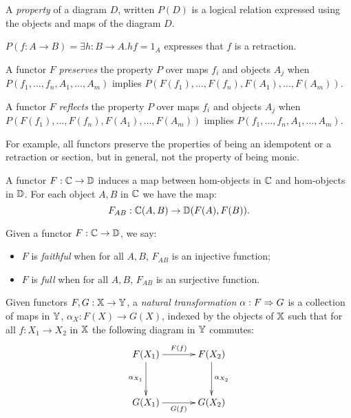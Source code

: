 \begin{definition}\label{def:property_of_a_diagram}
  A \emph{property} of a diagram $D$, written $P(D)$ is a logical relation expressed using the
  objects and maps of the diagram $D$.
\end{definition}

\begin{example}
  $P(f:A \to B) = \exists h : B \to A. h f = 1_A$ expresses that $f$ is a retraction.
\end{example}

\begin{definition}\label{def:functor_preserving_a_property}
  A functor $F$ \emph{preserves} the property $P$ over maps $f_i$ and objects $A_j$ when
  $P(f_1,\ldots,f_n, A_1,\ldots,A_m)$ implies $P(F(f_1),\ldots,F(f_n), F(A_1),\ldots,F(A_m))$.
\end{definition}

\begin{definition}\label{def:functor_reflects_a_property}
  A functor $F$ \emph{reflects} the property $P$ over maps $f_i$ and objects $A_j$ when
  $P(F(f_1),\ldots,F(f_n), F(A_1),\ldots,F(A_m))$ implies $P(f_1,\ldots,f_n, A_1,\ldots,A_m)$.
\end{definition}

For example, all functors preserve the properties of being an idempotent or a retraction or section,
but in general, not the property of being monic.

A functor $F:\mathbb{C} \to \mathbb{D}$ induces a map between hom-objects in $\mathbb{C}$ and hom-objects in $\mathbb{D}$. For
each object $A,B$ in $\mathbb{C}$ we have the map:
\[
  F_{AB} : \mathbb{C}(A,B) \to \mathbb{D}(F(A),F(B)).
\]

\begin{definition}\label{def:full_functor_faithful_functor}
  Given a functor $F:\mathbb{C} \to \mathbb{D}$, we say:
  \begin{itemize}
    \item $F$ is \emph{faithful} when for all $A,B$, $F_{AB}$ is an injective function;
    \item $F$ is \emph{full} when  for all $A,B$, $F_{AB}$ is an surjective function.
  \end{itemize}
\end{definition}



\begin{definition}\label{def:natural_transformation}
  Given functors $F,G:\mathbb{X} \to \mathbb{Y}$, a \emph{natural transformation} $\alpha:F \Rightarrow G$ is a collection
  of maps in $\mathbb{Y}$, $\alpha_X : F(X) \to G(X)$, indexed by the objects of $\mathbb{X}$ such that for all
  $f:X_1 \to X_2$ in $\mathbb{X}$ the following diagram in $\mathbb{Y}$ commutes:
  \[\xymatrix @R+10pt @C+10pt{
      F(X_1) \ar[r]^{F(f)} \ar[d]_{\alpha_{X_1}} & F(X_2) \ar[d]^{\alpha_{X_2}}\\
      G(X_1) \ar[r]_{G(f)} &  G(X_2)
    }
  \]
\end{definition}


